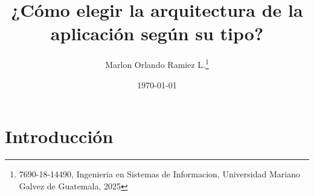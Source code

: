 \documentclass[11pt,letterpaper]{article}
\author{Marlon Orlando Ramiez L.\thanks{7690-18-14490, Ingenieria en Sistemas de Informacion, Universidad Mariano Galvez de Guatemala, 2025 }}
\title{¿Cómo elegir la arquitectura de la aplicación según su tipo?}
\date{\today}
\begin{document}
\maketitle





\begin{abstract}

\end{abstract}





\section*{Introducción} %


\end{document}
